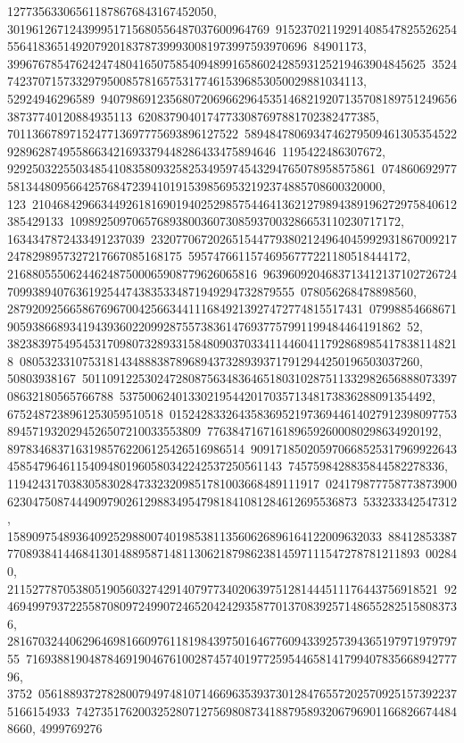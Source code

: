 {{{127735633065611878676843167452050, 301961267124399951715680556487037600964769\
91523702119291408547825526254556418365149207920183787399930081973997593970696\
84901173, 3996767854762424748041650758540948991658602428593125219463904845625\
3524742370715733297950085781657531774615396853050029881034113, 52924946296589\
94079869123568072069662964535146821920713570818975124965638737740120884935113\
62083790401747733087697881702382477385, 7011366789715247713697775693896127522\
58948478069347462795094613053545229289628749558663421693379448286433475894646\
1195422486307672, 92925032255034854108358093258253495974543294765078958575861\
074860692977581344809566425768472394101915398569532192374885708600320000, 123\
21046842966344926181690194025298575446413621279894389196272975840612385429133\
10989250970657689380036073085937003286653110230717172, 1634347872433491237039\
23207706720265154477938021249640459929318670092172478298957327217667085168175\
59574766115746956777221180518444172, 2168805550624462487500065908779626065816\
96396092046837134121371027267247099389407636192544743835334871949294732879555\
078056268478898560, 287920925665867696700425663441116849213927472774815517431\
07998854668671905938668934194393602209928755738361476937757991199484464191862\
52, 3823839754954531709807328933158480903703341144604117928689854178381148218\
0805323310753181434888387896894373289393717912944250196503037260, 50803938167\
50110912253024728087563483646518031028751133298265688807339708632180565766788\
53750062401330219544201703571348173836288091354492, 6752487238961253059510518\
01524283326435836952197369446140279123980977538945719320294526507210033553809\
7763847167161896592600080298634920192, 89783468371631985762206125426516986514\
90917185020597066852531796992264345854796461154094801960580342242537250561143\
7457598428835844582278336, 11942431703830583028473323209851781003668489111917\
02417987775877387390062304750874449097902612988349547981841081284612695536873\
533233342547312, 158909754893640925298800740198538113560626896164122009632033\
88412853387770893841446841301488958714811306218798623814597111547278781211893\
002840, 211527787053805190560327429140797734020639751281444511176443756918521\
924694997937225587080972499072465204242935877013708392571486552825158083736, 
   28167032440629646981660976118198439750164677609433925739436519797197979755\
71693881904878469190467610028745740197725954465814179940783566894277796, 3752\
05618893727828007949748107146696353937301284765572025709251573922375166154933\
74273517620032528071275698087341887958932067969011668266744848660, 4999769276\
}}}
